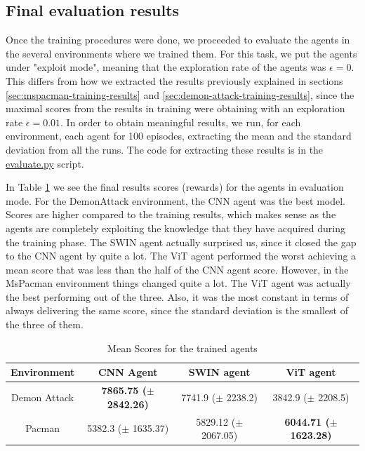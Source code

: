 \subsection{Final evaluation results}
Once the training procedures were done, we proceeded to evaluate the agents in the several environments where we trained them. For this task, we put the agents under "exploit mode", meaning that the exploration rate of the agents was $\epsilon=0$. This differs from how we extracted the results previously explained in sections \ref{sec:mspacman-training-results} and \ref{sec:demon-attack-training-results}, since the maximal scores from the results in training were obtaining with an exploration rate $\epsilon=0.01$. In order to obtain meaningful results, we run, for each environment, each agent for 100 episodes, extracting the mean and the standard deviation from all the runs. The code for extracting these results is in the \href{https://github.com/Javimh18/DL_TFM/blob/main/src/evaluate.py}{evaluate.py} script.

In Table \ref{tab:final_results} we see the final results scores (rewards) for the agents in evaluation mode. For the DemonAttack environment, the CNN agent was the best model. Scores are higher compared to the training results, which makes sense as the agents are completely exploiting the knowledge that they have acquired during the training phase. The SWIN agent actually surprised us, since it closed the gap to the CNN agent by quite a lot. The ViT agent performed the worst achieving a mean score that was less than the half of the CNN agent score. However, in the MsPacman environment things changed quite a lot. The ViT agent was actually the best performing out of the three. Also, it was the most constant in terms of always delivering the same score, since the standard deviation is the smallest of the three of them.

\begin{table}[!h]
	\begin{center}
		\caption[Mean Scores for the trained agents]{Mean Scores for the trained agents}
		\label{tab:final_results}
		\begin{tabular}{||c c c c||} 
			\hline
			Environment& CNN Agent & SWIN agent & ViT agent \\ [0.5ex] 
			\hline\hline
			Demon Attack& \textbf{7865.75 ($\pm$ 2842.26)} & 7741.9 ($\pm$ 2238.2) & 3842.9 ($\pm$ 2208.5) \\ 
			\hline
			Pacman & 5382.3 ($\pm$ 1635.37) & 5829.12 ($\pm$ 2067.05) &  \textbf{6044.71 ($\pm$ 1623.28)} \\
			\hline
		\end{tabular}
	\end{center}
\end{table}

